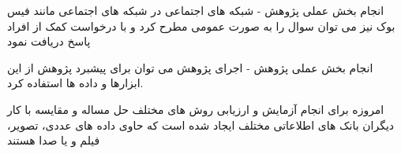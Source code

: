 \documentclass[14pt]{beamer}
\newcommand{\framefontsizelarge}{\fontsize{18pt}{0pt}\selectfont}
\newcommand{\frametitlefontsize}{\fontsize{20pt}{0pt}\selectfont}
\begin{document}
\begin{persian}
	\begin{frame}{\frametitlefontsize  انجام بخش عملی پژوهش - شبکه های اجتماعی }
		\framefontsizelarge
		در شبکه های اجتماعی مانند فیس بوک نیز می توان سوال را به صورت عمومی مطرح کرد و با درخواست کمک از افراد پاسخ دریافت نمود
	\end{frame}

	\begin{frame}{\frametitlefontsize  انجام بخش عملی پژوهش - اجرای پژوهش }
		\framefontsizelarge
		می توان برای پیشبرد پژوهش از این ابزارها و داده ها استفاده کرد. 
		
		امروزه برای انجام آزمایش و ارزیابی روش های مختلف حل مساله و مقایسه با کار دیگران بانک های اطلاعاتی مختلف ایجاد شده است که حاوی داده های عددی، تصویر، فیلم و یا صدا هستند
	\end{frame}

\end{persian}
\end{document}
